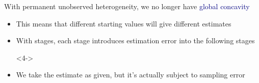 \documentclass[aspectratio=169]{beamer}
\begin{document}
\begin{frame}

With permanent unobserved heterogeneity, we no longer have \textcolor{navy}{global concavity}

\bigskip

\begin{itemize}
    \item This means that different starting values will give different estimates
\end{itemize}

\bigskip


\begin{itemize}
    \item<3-> With stages, each stage introduces estimation error into the following stages
    \item[]<4->
    \item<4-> We take the estimate as given, but it's actually subject to sampling error
\end{itemize}
\bigskip


\end{frame}
\end{document}
